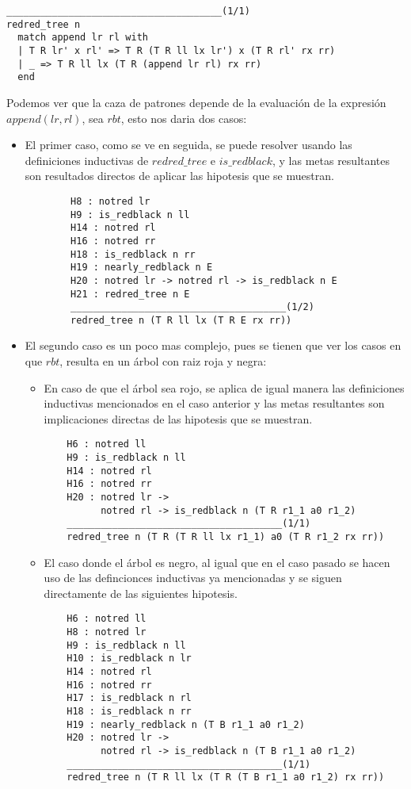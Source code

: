 \begin{verbatim}
______________________________________(1/1)
redred_tree n
  match append lr rl with
  | T R lr' x rl' => T R (T R ll lx lr') x (T R rl' rx rr)
  | _ => T R ll lx (T R (append lr rl) rx rr)
  end
\end{verbatim}

Podemos ver que la caza de patrones depende de la evaluaci\'on de la expresi\'on $append(lr,rl)$,
sea $rbt$, esto nos daria dos casos:

\begin{itemize}
    \item El primer caso, como se ve en seguida, se puede resolver usando las definiciones
    inductivas de $redred\_tree$ e $is\_redblack$, y las metas resultantes son resultados directos
    de aplicar las hipotesis que se muestran.
    \begin{verbatim}
        H8 : notred lr
        H9 : is_redblack n ll
        H14 : notred rl
        H16 : notred rr
        H18 : is_redblack n rr
        H19 : nearly_redblack n E
        H20 : notred lr -> notred rl -> is_redblack n E
        H21 : redred_tree n E
        ______________________________________(1/2)
        redred_tree n (T R ll lx (T R E rx rr))
    \end{verbatim}
    \item El segundo caso es un poco mas complejo, pues se tienen que ver los casos en que $rbt$,
    resulta en un \'arbol con raiz roja y negra:
    \begin{itemize}
        \item En caso de que el \'arbol sea rojo, se aplica de igual manera las definiciones
        inductivas mencionados en el caso anterior y las metas resultantes son implicaciones
        directas de las hipotesis que se muestran.
    \begin{verbatim}
    H6 : notred ll
    H9 : is_redblack n ll
    H14 : notred rl
    H16 : notred rr
    H20 : notred lr ->
          notred rl -> is_redblack n (T R r1_1 a0 r1_2)
    ______________________________________(1/1)
    redred_tree n (T R (T R ll lx r1_1) a0 (T R r1_2 rx rr))
    \end{verbatim}
        \item El caso donde el \'arbol es negro, al igual que en el caso pasado se hacen uso de
        las defincionces inductivas ya mencionadas y se siguen directamente de las siguientes
        hipotesis.
    \begin{verbatim}
    H6 : notred ll
    H8 : notred lr
    H9 : is_redblack n ll
    H10 : is_redblack n lr
    H14 : notred rl
    H16 : notred rr
    H17 : is_redblack n rl
    H18 : is_redblack n rr
    H19 : nearly_redblack n (T B r1_1 a0 r1_2)
    H20 : notred lr ->
          notred rl -> is_redblack n (T B r1_1 a0 r1_2)
    ______________________________________(1/1)
    redred_tree n (T R ll lx (T R (T B r1_1 a0 r1_2) rx rr))
    \end{verbatim}
    \end{itemize}
\end{itemize}

